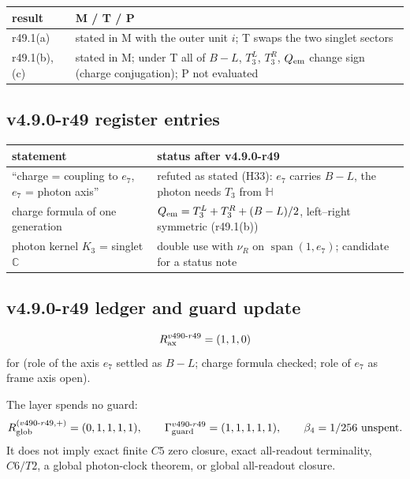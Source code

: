 \begin{center}
\small
\begin{tabular}{@{}>{\raggedright\arraybackslash}p{}>{\raggedright\arraybackslash}p{}@{}}
\toprule
result & M / T / P\\
\midrule
r49.1(a) & stated in M with the outer unit \(i\); T swaps the two singlet sectors\\
r49.1(b), (c) & stated in M; under T all of \(B-L\), \(T_3^L\), \(T_3^R\), \(Q_{\rm em}\) change sign (charge conjugation); P not evaluated\\
\bottomrule
\end{tabular}
\end{center}

\subsection*{v4.9.0-r49 register entries}
\label{subsec:v490-r49-register}

\begin{center}
\small
\begin{tabular}{@{}>{\raggedright\arraybackslash}p{}>{\raggedright\arraybackslash}p{}@{}}
\toprule
statement & status after v4.9.0-r49\\
\midrule
``charge = coupling to \(e_7\), \(e_7\) = photon axis'' & refuted as stated (H33): \(e_7\) carries \(B-L\), the photon needs \(T_3\) from \(\mathbb H\)\\
charge formula of one generation & \(Q_{\rm em}=T_3^L+T_3^R+(B-L)/2\), left--right symmetric (r49.1(b))\\
photon kernel \(K_3\) = singlet \(\mathbb C\) & double use with \(\nu_R\) on \(\operatorname{span}(1,e_7)\); candidate for a status note\\
\bottomrule
\end{tabular}
\end{center}

\subsection*{v4.9.0-r49 ledger and guard update}
\label{subsec:v490-r49-ledger-guard}

\[
R_{\rm ax}^{v490\text{-}r49}=(1,1,0)
\]
for (role of the axis \(e_7\) settled as \(B-L\); charge formula checked; role of \(e_7\) as frame axis open).

The layer spends no guard:
\[
R_{\rm glob}^{(v490\text{-}r49,+)}=(0,1,1,1,1),
\qquad
\Gamma_{\rm guard}^{v490\text{-}r49}=(1,1,1,1,1),
\qquad
\beta_4=1/256\ \text{unspent}.
\]
It does not imply exact finite \(C5\) zero closure, exact all-readout terminality,
\(C6/T2\), a global photon-clock theorem, or global all-readout closure.

